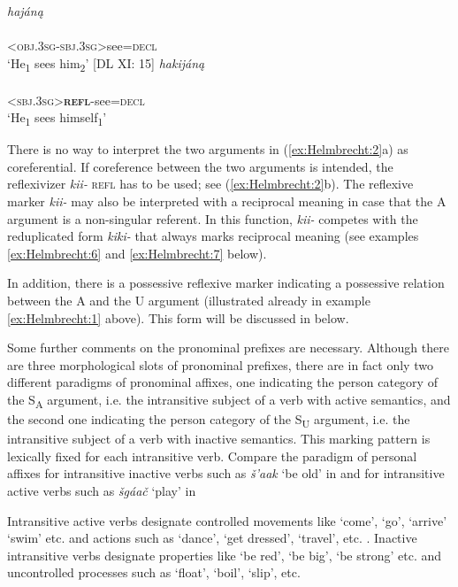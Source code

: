 \documentclass[output=paper]{langscibook}
\begin{document}
\ea \label{ex:Helmbrecht:2}
 \ea \textit{ hajáną }  \\
	\\
 {\textsc{<obj.3sg-sbj.3sg>}see=\textsc{decl}}\\
 \glt `He\textsubscript{1} sees him\textsubscript{2}' [DL XI: 15]
 \ex \textit{ hakijáną }\\
 	\\ 
 	{<\textsc{sbj.3sg}>\textbf{\textsc{\textsc{refl}}}{}-see=\textsc{decl}}\\
	\glt `He\textsubscript{1} sees himself\textsubscript{1}'
 \z 
\z 

There is no way to interpret the two arguments in (\ref{ex:Helmbrecht:2}a) as coreferential. If coreference between the two arguments is intended, the reflexivizer \textit{kii-} \textsc{refl} has to be used; see (\ref{ex:Helmbrecht:2}b). The reflexive marker \textit{kii-} may also be interpreted with a reciprocal meaning in case that the A argument is a non-singular referent. In this function, \textit{kii-} competes with the reduplicated form \textit{kiki-} that always marks reciprocal meaning (see examples \ref{ex:Helmbrecht:6} and \ref{ex:Helmbrecht:7} below).

In addition, there is a possessive reflexive marker indicating a possessive relation between the A and the U argument (illustrated already in example \ref{ex:Helmbrecht:1} above). This form will be discussed in  below.

Some further comments on the pronominal prefixes are necessary. Although there are three morphological slots of pronominal prefixes, there are in fact only two different paradigms of pronominal affixes, one indicating the person category of the S\textsubscript{A} argument, i.e. the intransitive subject of a verb with active semantics, and the second one indicating the person category of the S\textsubscript{U} argument, i.e. the intransitive subject of a verb with inactive semantics. This marking pattern is lexically fixed for each intransitive verb. Compare the paradigm of personal affixes for intransitive inactive verbs such as \textit{š'aak} `be old' in  and for intransitive active verbs such as \textit{šgáač} `play' in 

Intransitive active verbs designate controlled movements like `come', `go', `arrive' `swim' etc. and actions such as `dance', `get dressed', `travel', etc. . Inactive intransitive verbs designate properties like `be red', `be big', `be strong' etc. and uncontrolled processes such as `float', `boil', `slip', etc. 
\end{document}
